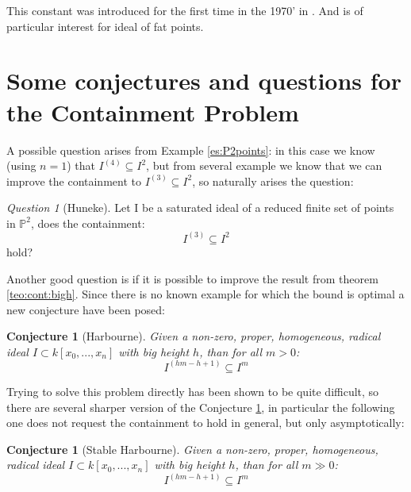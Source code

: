 \documentclass[notitlepage, a4]{book}
\theoremstyle{plain}
\newtheorem{conj}[teo]{Conjecture}
\theoremstyle{remark}
\newtheorem{que}[rem]{Question}
\theoremstyle{definition}
\newcommand{\PP}{\mathbb{P}}
\newcommand{\cont}[2]{ I^{(#1)} \subseteq I^{#2}}
\newcounter{que}
\begin{document}
This constant was introduced for the first time in the 1970' in \cite{Wald77}. And is of particular interest for ideal of fat points. 

\section[Conjectures]{Some conjectures and questions for the Containment Problem}
	A possible question arises from Example \ref{es:P2points}: in this case we know (using $ n=1 $) that $ \cont{4}{2}$, but from several example we know that we can improve the containment to $ \cont{3}{2} $, so naturally arises the question:
	\begin{que}[Huneke] \label{que:32}
	Let I be a saturated ideal of a reduced finite set of points in $ \PP^2 $, does the containment:
	\[ \cont{3}{2} \]
	hold?
	\end{que}
	
%	
	
	Another good question is if it is possible to improve the result from theorem \ref{teo:cont:bigh}. Since there is no known example for which the bound is optimal a new conjecture have been posed:
	
	\begin{conj}[Harbourne]\label{conj:harb}
		Given a non-zero, proper, homogeneous, radical ideal $ I \subset k[x_0 , ... , x_n] $ with big height $ h $, than for all $ m > 0 $:
		\[
		\cont{hm - h +1}{m}
		\]
	\end{conj}
	
	Trying to solve this problem directly has been shown to be quite difficult, so there are several  sharper version of the Conjecture \ref{conj:harb}, in particular the following one does not request the containment to hold in general, but only asymptotically:
	
	\begin{conj}[Stable Harbourne]\label{conj:stabharb}
			Given a non-zero, proper, homogeneous, radical ideal $ I \subset k[x_0 , ... , x_n] $ with big height $ h $, than for all $ m \gg 0 $:
			\[
			\cont{hm - h +1}{m}
			\]
	\end{conj} 
	
\end{document}
